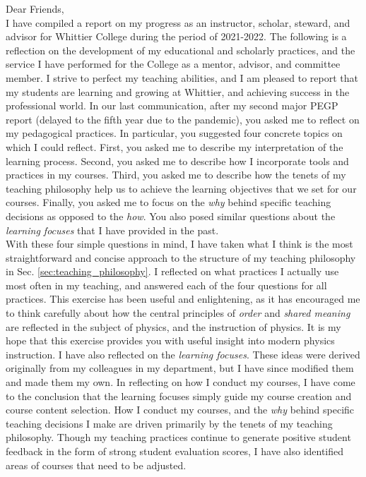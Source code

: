 \documentclass[../../main.tex]{subfiles}
\begin{document}
Dear Friends,
\\
\vspace{0.15cm}
I have compiled a report on my progress as an instructor, scholar, steward, and advisor for Whittier College during the period of 2021-2022.  The following is a reflection on the development of my educational and scholarly practices, and the service I have performed for the College as a mentor, advisor, and committee member. I strive to perfect my teaching abilities, and I am pleased to report that my students are learning and growing at Whittier, and achieving success in the professional world.  In our last communication, after my second major PEGP report (delayed to the fifth year due to the pandemic), you asked me to reflect on my pedagogical practices.  In particular, you suggested four concrete topics on which I could reflect.  First, you asked me to describe my interpretation of the learning process.  Second, you asked me to describe how I incorporate tools and practices in my courses.  Third, you asked me to describe how the tenets of my teaching philosophy help us to achieve the learning objectives that we set for our courses.  Finally, you asked me to focus on the \textit{why} behind specific teaching decisions as opposed to the \textit{how}.  You also posed similar questions about the \textit{learning focuses} that I have provided in the past.
\\
\vspace{0.25cm}
With these four simple questions in mind, I have taken what I think is the most straightforward and concise approach to the structure of my teaching philosophy in Sec. \ref{sec:teaching_philosophy}.  I reflected on what practices I actually use most often in my teaching, and answered each of the four questions for all practices.  This exercise has been useful and enlightening, as it has encouraged me to think carefully about how the central principles of \textit{order} and \textit{shared meaning} are reflected in the subject of physics, and the instruction of physics.  It is my hope that this exercise provides you with useful insight into modern physics instruction.  I have also reflected on the \textit{learning focuses}.  These ideas were derived originally from my colleagues in my department, but I have since modified them and made them my own.  In reflecting on how I conduct my courses, I have come to the conclusion that the learning focuses simply guide my course creation and course content selection.  How I conduct my courses, and the \textit{why} behind specific teaching decisions I make are driven primarily by the tenets of my teaching philosophy.  Though my teaching practices continue to generate positive student feedback in the form of strong student evaluation scores, I have also identified areas of courses that need to be adjusted.
\end{document}
